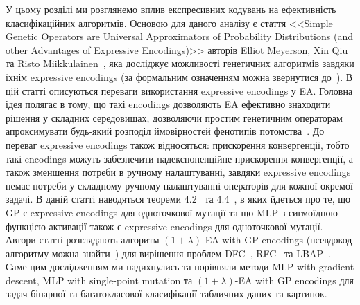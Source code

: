 У цьому розділі ми розглянемо вплив експресивних кодувань на ефективність класифікаційних алгоритмів. Основою для даного аналізу є стаття <<Simple Genetic Operators are Universal Approximators of Probability Distributions (and other Advantages of Expressive Encodings)>> авторів Elliot Meyerson, Xin Qiu та Risto Miikkulainen~\cite{ct25}, яка досліджує можливості генетичних алгоритмів завдяки їхнім expressive encodings (за формальним означенням можна звернутися до~\cite[Definition 1, стор. 3]{ct25}). В цій статті описуються переваги використання expressive encodings у EA. Головна ідея полягає в тому, що такі encodings дозволяють EA ефективно знаходити рішення у складних середовищах, дозволяючи простим генетичним операторам~\cite[підрозділ 2.2.3, стор. 3]{ct25} апроксимувати будь-який розподіл ймовірностей фенотипів потомства~\cite[розділ 2.1, стор. 2]{ct25}. До переваг expressive encodings також відносяться: прискорення конвергенції, тобто такі encodings можуть забезпечити надекспоненційне прискорення конвергенції, а також зменшення потреби в ручному налаштуванні, завдяки expressive encodings немає потреби у складному ручному налаштуванні операторів для кожної окремої задачі. В даній статті наводяться теореми 4.2~\cite[Theorem 4.2]{ct25} та 4.4~\cite[Theorem 4.4]{ct25}, в яких йдеться про те, що GP є expressive encodings для одноточкової мутації та що MLP з сигмоїдною функцією активації також є expressive encodings для одноточкової мутації. Автори статті розглядають алгоритм $(1+\lambda)$-EA with GP encodings (псевдокод алгоритму можна знайти~\cite[Appendix B, стор. 12]{ct25}) для вирішення проблем DFC~\cite[Problem 1, стор. 6]{ct25}, RFC~\cite[Problem 2, стор. 7]{ct25} та LBAP~\cite[Problem 3, стор. 7]{ct25}. Саме цим дослідженням ми надихнулись та порівняли методи MLP with gradient descent, MLP with single-point mutation та $(1+\lambda)$-EA with GP encodings для задач бінарної та багатокласової класифікації табличних даних та картинок.

\chapconclude{\ref{chap:theory}}

